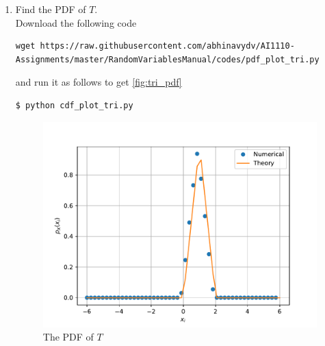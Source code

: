 \documentclass[journal,12pt,twocolumn]{IEEEtran}
\renewcommand\thesection{\arabic{section}}
\begin{document}
\begin{enumerate}[label=\thesection.\arabic*
        ,ref=\thesection.\theenumi]
    \item Find the PDF of $T$.\\
          \solution  Download the following code
          \begin{lstlisting}
wget https://raw.githubusercontent.com/abhinavydv/AI1110-Assignments/master/RandomVariablesManual/codes/pdf_plot_tri.py
\end{lstlisting}
          and run it as follows to get \autoref{fig:tri_pdf}
          \begin{lstlisting}
$ python cdf_plot_tri.py
\end{lstlisting}
          \begin{figure}
              \centering
              \includegraphics[width=\columnwidth]{./figs/tri_pdf}
              \caption{The PDF of $T$}
              \label{fig:tri_pdf}
          \end{figure}


\end{enumerate}
\end{document}
